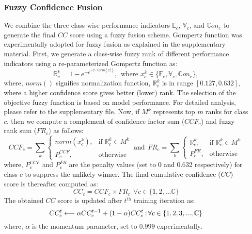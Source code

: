 \documentclass[runningheads]{llncs}
\begin{document}
\subsubsection{Fuzzy Confidence Fusion}\label{fuzzy_fusion}
We combine the three class-wise performance indicators $\mathbb{E}_c$, $\mathbb{V}_c$, and $\mathbb{C}on_c$ to generate the final $CC$ score using a fuzzy fusion scheme. Gompertz function was experimentally adopted for fuzzy fusion as explained in the supplementary material. First, we generate a class-wise fuzzy rank of different performance indicators using a re-parameterized Gompertz function \cite{kundu2021fuzzy} as:
\begin{equation}
    \mathbb{R}_c^k = 1-e^{-e^{-2\cdot norm (x_c^k)}}, \:\: \text{where }x_c^k\in\{\mathbb{E}_c, \mathbb{V}_c, \mathbb{C}on_c\},
\end{equation}
where, $norm()$ signifies normalization function, $\mathbb{R}_c^k$ is in range $[0.127,0.632]$, where a higher confidence score gives better (lower) rank. The selection of the objective fuzzy function is based on model performance. For detailed analysis, please refer to the supplementary file. Now, if $M^k$ represents top $m$ ranks for class $c$, then we compute a complement of confidence factor sum ($CCF_c$) and fuzzy rank sum ($FR_c$) as follows:
\begin{equation}
    CCF_c = \sum_{k} \begin{cases}
            norm(x_c^k), &\text{if } \mathbb{R}_c^k \in M^k \\
            P_{c}^{CCF}, &\text{otherwise }
        \end{cases}
        \:\text{and}\:\:
         FR_c = \sum_k \begin{cases}
    \mathbb{R}_c^k, &\text{if } \mathbb{R}_c^k \in M^k \\
    P_c^{FR}, &\text{otherwise }
    \end{cases}
\end{equation}
where, $P_{c}^{CCF}$ and $P_c^{FR}$ are the penalty values (set to 0 and 0.632 respectively) for class $c$ to suppress the unlikely winner. The final cumulative confidence ($CC$) score is thereafter computed as:
\begin{equation}\label{fuzzy_equation}
    CC_c = CCF_c \times FR_c \:\:\forall c\in\{1,2,...\mathbb{C}\}
\end{equation}
The obtained $CC$ score is updated after $t^{\text{th}}$ training iteration as:
\begin{equation}
    CC_c^{t} \longleftarrow \alpha CC_c^{t-1}+(1-\alpha) CC_c^{t} \: ;\\
    \forall c\in\{1,2,3,...,\mathbb{C}\}
\end{equation}
where, $\alpha$ is the momentum parameter, set to $0.999$ experimentally. 
\end{document}
